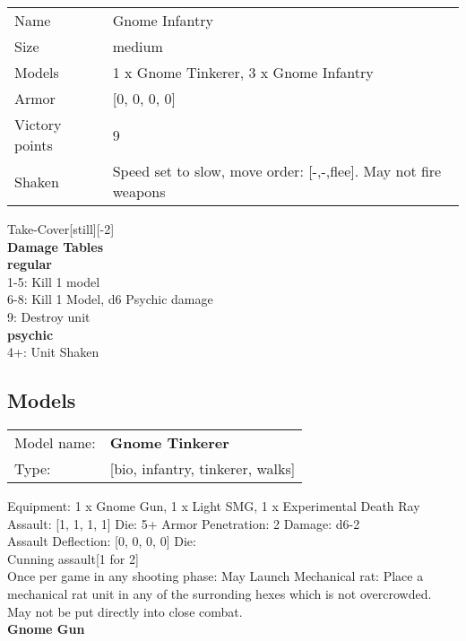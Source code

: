 \begin{tabular}{ll}
  Name & Gnome Infantry \\
  Size & medium\\
  Models & 1 x Gnome Tinkerer, 3 x Gnome Infantry\\
  Armor & [0, 0, 0, 0]\\
  Victory points & 9\\
  Shaken & Speed set to slow, move order: [-,-,flee]. May not fire weapons\\
\end{tabular}

Take-Cover[still][-2]\\ 



{\bf Damage Tables} \\
 {\bf regular } \\
1-5: Kill 1 model \\
6-8: Kill 1 Model, d6 Psychic damage \\
9: Destroy unit \\
 {\bf psychic } \\
4+: Unit Shaken \\


\clearpage

\subsection{ Models }

\begin{tabular}{ll}
Model name: & {\bf Gnome Tinkerer } \\
Type: & [bio, infantry, tinkerer, walks] \\
\end{tabular}

Equipment: 1 x Gnome Gun, 1 x Light SMG, 1 x Experimental Death Ray \\

Assault: [1, 1, 1, 1] Die: 5+ Armor Penetration: 2 Damage: d6-2 \\
Assault Deflection: [0, 0, 0, 0] Die: \\
\indent Cunning assault[1 for 2]\\ 
 

Once per game in any shooting phase: May Launch Mechanical rat: Place a mechanical rat unit in any of the surronding hexes which is not overcrowded. May not be put directly into close combat. \\ 


{\bf Gnome Gun } \\



